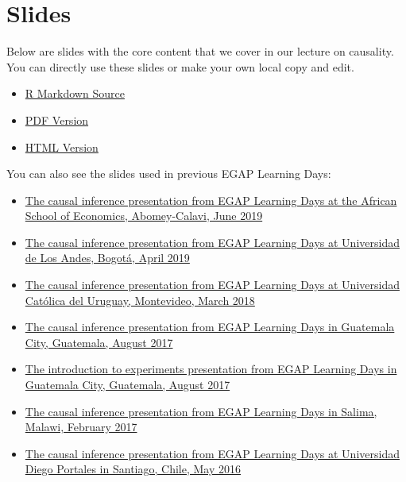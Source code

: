 \documentclass[12pt,]{book}
\begin{document}
\hypertarget{slides-1}{%
\section{Slides}\label{slides-1}}

Below are slides with the core content that we cover in our lecture on causality. You can directly use these slides or make your own local copy and edit.

\begin{itemize}
\item
  \href{https://egap.github.io/learningdays-resources/Slides/causalinference-slides.Rmd}{R Markdown Source}
\item
  \href{https://egap.github.io/learningdays-resources/Slides/causalinference-slides.pdf}{PDF Version}
\item
  \href{https://egap.github.io/learningdays-resources/Slides/causalinference-slides.html}{HTML Version}
\end{itemize}

You can also see the slides used in previous EGAP Learning Days:

\begin{itemize}
\item
  \href{https://egap.github.io/learningdays-resources/Slides/Examples/causality-benin.pdf}{The causal inference presentation from EGAP Learning Days at the African School of Economics, Abomey-Calavi, June 2019}
\item
  \href{https://egap.github.io/learningdays-resources/Slides/Examples/causality-bogota.pdf}{The causal inference presentation from EGAP Learning Days at Universidad de Los Andes, Bogotá, April 2019}
\item
  \href{https://egap.github.io/learningdays-resources/Slides/Examples/causality-montevideo.pdf}{The causal inference presentation from EGAP Learning Days at Universidad Católica del Uruguay, Montevideo, March 2018}
\item
  \href{https://egap.github.io/learningdays-resources/Slides/Examples/causality-guatemala.pdf}{The causal inference presentation from EGAP Learning Days in Guatemala City, Guatemala, August 2017}
\item
  \href{https://egap.github.io/learningdays-resources/Slides/Examples/intro_experiments-guatemala.pdf}{The introduction to experiments presentation from EGAP Learning Days in Guatemala City, Guatemala, August 2017}
\item
  \href{https://egap.github.io/learningdays-resources/Slides/Examples/causality-malawi.pdf}{The causal inference presentation from EGAP Learning Days in Salima, Malawi, February 2017}
\item
  \href{https://egap.github.io/learningdays-resources/Slides/Examples/causality-santiago.pdf}{The causal inference presentation from EGAP Learning Days at Universidad Diego Portales in Santiago, Chile, May 2016}
\end{itemize}
\end{document}
